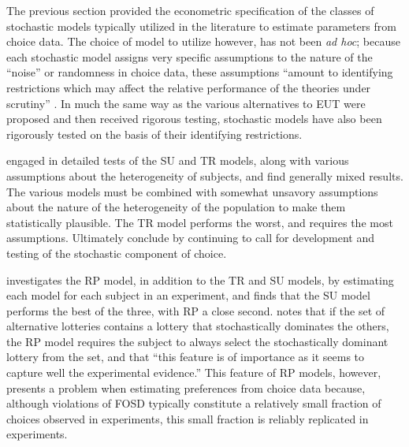 \documentclass[../main.tex]{subfiles}
\begin{document}
The previous section provided the econometric specification of the classes of stochastic models typically utilized in the literature to estimate parameters from choice data.
The choice of model to utilize however, has not been \textit{ad hoc};
because each stochastic model assigns very specific assumptions to the nature of the \enquote{noise} or randomness in choice data, these assumptions \enquote{amount to identifying restrictions which may affect the relative performance of the theories under scrutiny} \parencite[1091]{Ballinger1997}.
In much the same way as the various alternatives to EUT were proposed and then received rigorous testing, stochastic models have also been rigorously tested on the basis of their identifying restrictions.

\textcite{Ballinger1997} engaged in detailed tests of the SU and TR models, along with various assumptions about the heterogeneity of subjects, and find generally mixed results.
The various models must be combined with somewhat unsavory assumptions about the nature of the heterogeneity of the population to make them statistically plausible.
The TR model performs the worst, and requires the most assumptions.
Ultimately \textcite[1104]{Ballinger1997} conclude by continuing to call for development and testing of the stochastic component of choice.

\textcite{Carbone1997} investigates the RP model, in addition to the TR and SU models, by estimating each model for each subject in an experiment, and finds that the SU model performs the best of the three, with RP a close second.
\textcite[307]{Carbone1997} notes that if the set of alternative lotteries contains a lottery that stochastically dominates the others, the RP model requires the subject to always select the stochastically dominant lottery from the set, and that \enquote{this feature is of importance as it seems to capture well the experimental evidence.}
This feature of RP models, however, presents a problem when estimating preferences from choice data because, although violations of FOSD typically constitute a relatively small fraction of choices observed in experiments, this small fraction is reliably replicated in experiments.
\end{document}
